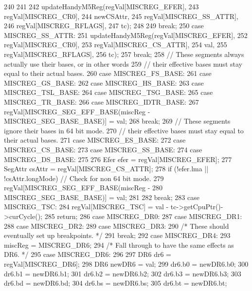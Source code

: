 \begin{DoxyCode}
{{{{{240                 }
241             }
242             updateHandyM5Reg(regVal[MISCREG_EFER],
243                              regVal[MISCREG_CR0],
244                              newCSAttr,
245                              regVal[MISCREG_SS_ATTR],
246                              regVal[MISCREG_RFLAGS],
247                              tc);
248         }
249         break;
250       case MISCREG_SS_ATTR:
251         updateHandyM5Reg(regVal[MISCREG_EFER],
252                          regVal[MISCREG_CR0],
253                          regVal[MISCREG_CS_ATTR],
254                          val,
255                          regVal[MISCREG_RFLAGS],
256                          tc);
257         break;
258       // These segments always actually use their bases, or in other words
259       // their effective bases must stay equal to their actual bases.
260       case MISCREG_FS_BASE:
261       case MISCREG_GS_BASE:
262       case MISCREG_HS_BASE:
263       case MISCREG_TSL_BASE:
264       case MISCREG_TSG_BASE:
265       case MISCREG_TR_BASE:
266       case MISCREG_IDTR_BASE:
267         regVal[MISCREG_SEG_EFF_BASE(miscReg - MISCREG_SEG_BASE_BASE)] = val;
268         break;
269       // These segments ignore their bases in 64 bit mode.
270       // their effective bases must stay equal to their actual bases.
271       case MISCREG_ES_BASE:
272       case MISCREG_CS_BASE:
273       case MISCREG_SS_BASE:
274       case MISCREG_DS_BASE:
275         {
276             Efer efer = regVal[MISCREG_EFER];
277             SegAttr csAttr = regVal[MISCREG_CS_ATTR];
278             if (!efer.lma || !csAttr.longMode) // Check for non 64 bit mode.
279                 regVal[MISCREG_SEG_EFF_BASE(miscReg -
280                         MISCREG_SEG_BASE_BASE)] = val;
281         }
282         break;
283       case MISCREG_TSC:
284         regVal[MISCREG_TSC] = val - tc->getCpuPtr()->curCycle();
285         return;
286       case MISCREG_DR0:
287       case MISCREG_DR1:
288       case MISCREG_DR2:
289       case MISCREG_DR3:
290         /* These should eventually set up breakpoints. */
291         break;
292       case MISCREG_DR4:
293         miscReg = MISCREG_DR6;
294         /* Fall through to have the same effects as DR6. */
295       case MISCREG_DR6:
296         {
297             DR6 dr6 = regVal[MISCREG_DR6];
298             DR6 newDR6 = val;
299             dr6.b0 = newDR6.b0;
300             dr6.b1 = newDR6.b1;
301             dr6.b2 = newDR6.b2;
302             dr6.b3 = newDR6.b3;
303             dr6.bd = newDR6.bd;
304             dr6.bs = newDR6.bs;
305             dr6.bt = newDR6.bt;
}}}
\end{DoxyCode}
